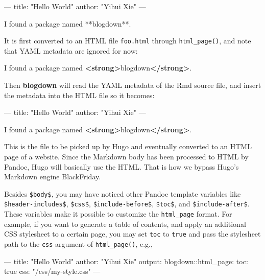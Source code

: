 \documentclass[12pt,]{krantz}
\makeatletter
\newenvironment{Shaded}{\begin{snugshade}}{\end{snugshade}}
\newcommand{\KeywordTok}[1]{\textcolor[rgb]{0.13,0.29,0.53}{\textbf{#1}}}
\newcommand{\StringTok}[1]{\textcolor[rgb]{0.31,0.60,0.02}{#1}}
\newcommand{\OtherTok}[1]{\textcolor[rgb]{0.56,0.35,0.01}{#1}}
\newcommand{\FunctionTok}[1]{\textcolor[rgb]{0.00,0.00,0.00}{#1}}
\newcommand{\AttributeTok}[1]{\textcolor[rgb]{0.77,0.63,0.00}{#1}}
\newcommand{\NormalTok}[1]{#1}
\newenvironment{kframe}{%
\medskip{}
\setlength{\fboxsep}{.8em}
 \def\at@end@of@kframe{}%
 \ifinner\ifhmode%
  \def\at@end@of@kframe{\end{minipage}}%
  \begin{minipage}{\columnwidth}%
 \fi\fi%
 \def\FrameCommand##1{\hskip\@totalleftmargin \hskip-\fboxsep
 \colorbox{shadecolor}{##1}\hskip-\fboxsep
     \hskip-\linewidth \hskip-\@totalleftmargin \hskip\columnwidth}%
 \MakeFramed {\advance\hsize-\width
   \@totalleftmargin\z@ \linewidth\hsize
   \@setminipage}}%
 {\par\unskip\endMakeFramed%
 \at@end@of@kframe}
\renewenvironment{Shaded}{\begin{kframe}}{\end{kframe}}
\theoremstyle{definition}
\theoremstyle{definition}
\theoremstyle{definition}
\theoremstyle{remark}
\makeatother
\begin{document}
\begin{Shaded}
\begin{Highlighting}[]
\NormalTok{---}
\NormalTok{title: "Hello World"}
\NormalTok{author: "Yihui Xie"}
\NormalTok{---}

\NormalTok{I found a package named **blogdown**.}
\end{Highlighting}
\end{Shaded}

It is first converted to an HTML file \texttt{foo.html} through
\texttt{html\_page()}, and note that YAML metadata are ignored for now:

\begin{Shaded}
\begin{Highlighting}[]
\NormalTok{I found a package named }\KeywordTok{<strong>}\NormalTok{blogdown}\KeywordTok{</strong>}\NormalTok{.}
\end{Highlighting}
\end{Shaded}

Then \textbf{blogdown} will read the YAML metadata of the Rmd source
file, and insert the metadata into the HTML file so it becomes:

\begin{Shaded}
\begin{Highlighting}[]
\NormalTok{---}
\NormalTok{title: "Hello World"}
\NormalTok{author: "Yihui Xie"}
\NormalTok{---}

\NormalTok{I found a package named }\KeywordTok{<strong>}\NormalTok{blogdown}\KeywordTok{</strong>}\NormalTok{.}
\end{Highlighting}
\end{Shaded}

This is the file to be picked up by Hugo and eventually converted to an
HTML page of a website. Since the Markdown body has been processed to
HTML by Pandoc, Hugo will basically use the HTML. That is how we bypass
Hugo's Markdown engine BlackFriday.

Besides \texttt{\$body\$}, you may have noticed other Pandoc template
variables like \texttt{\$header-includes\$}, \texttt{\$css\$},
\texttt{\$include-before\$}, \texttt{\$toc\$}, and
\texttt{\$include-after\$}. These variables make it possible to
customize the \texttt{html\_page} format. For example, if you want to
generate a table of contents, and apply an additional CSS stylesheet to
a certain page, you may set \texttt{toc} to \texttt{true} and pass the
stylesheet path to the \texttt{css} argument of \texttt{html\_page()},
e.g.,

\begin{Shaded}
\begin{Highlighting}[]
\OtherTok{---}
\FunctionTok{title:}\AttributeTok{ }\StringTok{"Hello World"}
\FunctionTok{author:}\AttributeTok{ }\StringTok{"Yihui Xie"}
\FunctionTok{output:}
  \FunctionTok{blogdown:}\AttributeTok{:html_page:}
    \FunctionTok{toc:}\AttributeTok{ true}
    \FunctionTok{css:}\AttributeTok{ }\StringTok{"/css/my-style.css"}
\OtherTok{---}
\end{Highlighting}
\end{Shaded}
\end{document}
